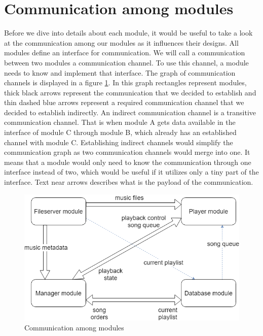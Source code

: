 \section{Communication among modules}

Before we dive into details about each module, it would be useful to take a look at the communication among our modules as it influences their designs. All modules define an interface for communication. We will call a communication between two modules a communication channel. To use this channel, a module needs to know and implement that interface. The graph of communication channels is displayed in a figure \ref{fig02:communicationAmongModules}. In this graph rectangles represent modules, thick black arrows represent the communication that we decided to establish and thin dashed blue arrows represent a required communication channel that we decided to establish indirectly. An indirect communication channel is a transitive communication channel. That is when module A gets data available in the interface of module C through module B, which already has an established channel with module C. Establishing indirect channels would simplify the communication graph as two communication channels would merge into one. It means that a module would only need to know the communication through one interface instead of two, which would be useful if it utilizes only a tiny part of the interface. Text near arrows describes what is the payload of the communication. 

\begin{figure}[ht]\centering
\includegraphics[width=1.0\textwidth]{img/CommunicationGraph}
\caption{Communication among modules}
\label{fig02:communicationAmongModules}
\end{figure}

